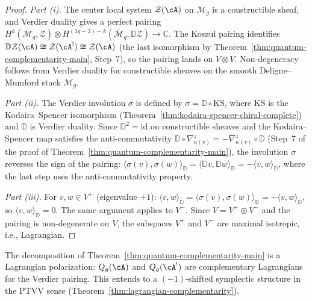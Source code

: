 \begin{proof}
\emph{Part (i).}
The center local system $\mathcal{Z}(\cA)$ on
$\overline{\mathcal{M}}_g$ is a constructible sheaf, and Verdier
duality gives a perfect pairing
$H^k(\overline{\mathcal{M}}_g, \mathcal{Z}) \otimes
H^{(3g-3)-k}(\overline{\mathcal{M}}_g, \mathbb{D}\mathcal{Z})
\to \mathbb{C}$.
The Koszul pairing identifies $\mathbb{D}\mathcal{Z}(\cA) \cong
\mathcal{Z}(\cA^!) \cong \mathcal{Z}(\cA)$
(the last isomorphism by
Theorem~\ref{thm:quantum-complementarity-main}, Step~7), so the
pairing lands on $V \otimes V$.  Non-degeneracy follows from Verdier
duality for constructible sheaves on the smooth Deligne--Mumford
stack $\overline{\mathcal{M}}_g$.

\emph{Part (ii).}
The Verdier involution $\sigma$ is defined by
$\sigma = \mathbb{D} \circ \mathrm{KS}$, where $\mathrm{KS}$ is
the Kodaira--Spencer isomorphism
(Theorem~\ref{thm:kodaira-spencer-chiral-complete}) and
$\mathbb{D}$ is Verdier duality.  Since $\mathbb{D}^2 = \mathrm{id}$
on constructible sheaves and the Kodaira--Spencer map satisfies
the anti-commutativity
$\mathbb{D} \circ \nabla_{\kappa(v)}^z =
-\nabla_{\kappa(v)}^z \circ \mathbb{D}$
(Step~7 of the proof of
Theorem~\ref{thm:quantum-complementarity-main}), the involution
$\sigma$ reverses the sign of the pairing:
$\langle \sigma(v), \sigma(w) \rangle_{\mathbb{D}}
= \langle \mathbb{D}v, \mathbb{D}w \rangle_{\mathbb{D}}
= -\langle v, w \rangle_{\mathbb{D}}$,
where the last step uses the anti-commutativity property.

\emph{Part (iii).}
For $v, w \in V^+$ (eigenvalue $+1$):
$\langle v, w \rangle_{\mathbb{D}}
= \langle \sigma(v), \sigma(w) \rangle_{\mathbb{D}}
= -\langle v, w \rangle_{\mathbb{D}}$,
so $\langle v, w \rangle_{\mathbb{D}} = 0$.  The same argument
applies to $V^-$.  Since $V = V^+ \oplus V^-$ and the pairing is
non-degenerate on $V$, the subspaces $V^+$ and $V^-$ are maximal
isotropic, i.e., Lagrangian.
\end{proof}

\begin{remark}\label{rem:lagrangian-complementarity}
The decomposition of
Theorem~\ref{thm:quantum-complementarity-main} is a Lagrangian
polarization: $Q_g(\cA)$ and $Q_g(\cA^!)$ are complementary
Lagrangians for the Verdier pairing.
This extends to a $(-1)$-shifted symplectic structure in the PTVV
sense (Theorem~\ref{thm:lagrangian-complementarity}).
\end{remark}

